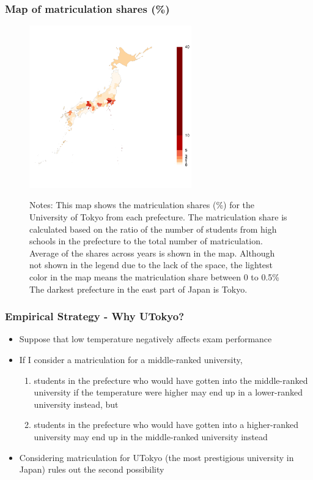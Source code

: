\documentclass[10pt, pdfmx,hiresbb]{beamer}
\begin{document}
\begin{frame}\frametitle{Map of matriculation shares (\%)}
  \begin{center}
    \begin{figure}
      \includegraphics[width=7cm]{../Output/images/admission_map.pdf}
      \tiny
      \begin{tablenotes}
      \item Notes:
        This map shows the matriculation shares (\%) for the University of Tokyo from each prefecture.
        The matriculation share is calculated based on the ratio of the number of students from high schools in the prefecture to the total number of matriculation.
        Average of the shares across years is shown in the map.
        Although not shown in the legend due to the lack of the space, the lightest color in the map means the matriculation share between 0 to 0.5\% 
        The darkest prefecture in the east part of Japan is Tokyo.
      \end{tablenotes}
    \end{figure}
  \end{center}
\end{frame}

\begin{frame}\frametitle{Empirical Strategy - Why UTokyo?}
  \begin{itemize}
    \item Suppose that low temperature negatively affects exam performance
    \item If I consider a matriculation for a middle-ranked university,
      \begin{enumerate}
        \item students in the prefecture who would have gotten into the middle-ranked university if the temperature were higher may end up in a lower-ranked university instead, but
        \item students in the prefecture who would have gotten into a higher-ranked university may end up in the middle-ranked university instead
      \end{enumerate}
    \item Considering matriculation for UTokyo (the most prestigious university in Japan) rules out the second possibility
  \end{itemize}
\end{frame}
\end{document}
